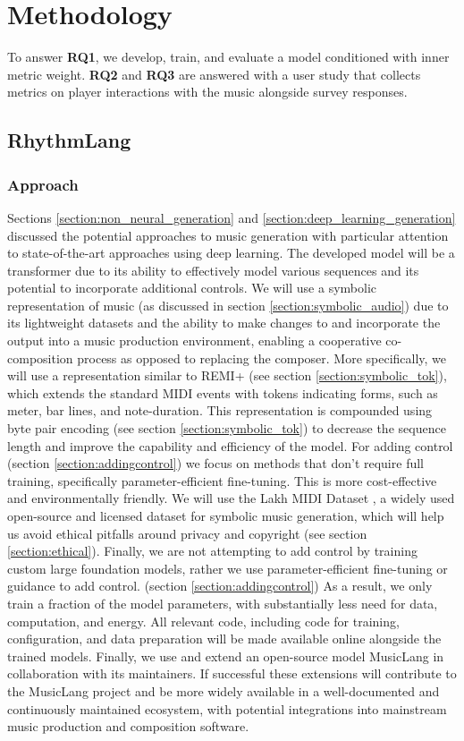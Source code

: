 \chapter{Methodology}
To answer \textbf{RQ1}, we develop, train, and evaluate a model conditioned with inner metric weight. \textbf{RQ2} and \textbf{RQ3} are answered with a user study that collects metrics on player interactions with the music alongside survey responses. 

\section{RhythmLang}

\subsection{Approach}
Sections \ref{section:non_neural_generation} and \ref{section:deep_learning_generation} discussed the potential approaches to music generation with particular attention to state-of-the-art approaches using deep learning. The developed model will be a transformer due to its ability to effectively model various sequences and its potential to incorporate additional controls. We will use a symbolic representation of music (as discussed in section \ref{section:symbolic_audio}) due to its lightweight datasets and the ability to make changes to and incorporate the output into a music production environment, enabling a cooperative co-composition process as opposed to replacing the composer. More specifically, we will use a representation similar to REMI+ (see section \ref{section:symbolic_tok}), which extends the standard MIDI events with tokens indicating forms, such as meter, bar lines, and note-duration. This representation is compounded using byte pair encoding (see section \ref{section:symbolic_tok}) to decrease the sequence length and improve the capability and efficiency of the model. For adding control (section \ref{section:addingcontrol}) we focus on methods that don't require full training, specifically parameter-efficient fine-tuning. This is more cost-effective and environmentally friendly. 
We will use the Lakh MIDI Dataset \cite{Raffel_2016}, a widely used open-source and licensed dataset for symbolic music generation, which will help us avoid ethical pitfalls around privacy and copyright (see section \ref{section:ethical}). Finally, we are not attempting to add control by training custom large foundation models, rather we use parameter-efficient fine-tuning or guidance to add control. (section \ref{section:addingcontrol}) As a result, we only train a fraction of the model parameters, with substantially less need for data, computation, and energy. All relevant code, including code for training, configuration, and data preparation will be made available online alongside the trained models. Finally, we use and extend an open-source model MusicLang in collaboration with its maintainers. If successful these extensions will contribute to the MusicLang project and be more widely available in a well-documented and continuously maintained ecosystem, with potential integrations into mainstream music production and composition software. 

